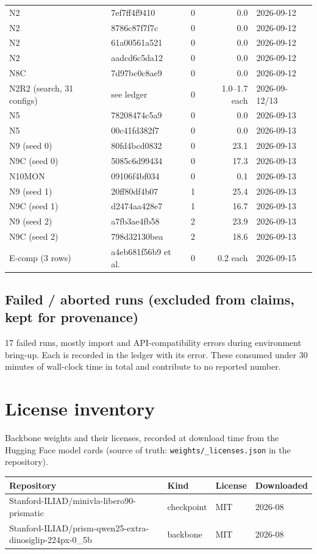 \documentclass[10pt]{article}
\begin{document}
\begin{longtable}{@{}llrrl@{}}
N2 & 7ef7ff4f9410 & 0 & 0.0 & 2026-09-12 \\
N2 & 8786c87f7f7c & 0 & 0.0 & 2026-09-12 \\
N2 & 61a00561a521 & 0 & 0.0 & 2026-09-12 \\
N2 & aadcd6c5da12 & 0 & 0.0 & 2026-09-12 \\
N8C & 7d97bc0c8ae9 & 0 & 0.0 & 2026-09-12 \\
N2R2 (search, 31 configs) & see ledger & 0 & 1.0--1.7 each & 2026-09-12/13 \\
N5 & 78208474c5a9 & 0 & 0.0 & 2026-09-13 \\
N5 & 00c41fd382f7 & 0 & 0.0 & 2026-09-13 \\
N9 (seed 0) & 80fd4bcd0832 & 0 & 23.1 & 2026-09-13 \\
N9C (seed 0) & 5085c6d99434 & 0 & 17.3 & 2026-09-13 \\
N10MON & 09106f4bf034 & 0 & 0.1 & 2026-09-13 \\
N9 (seed 1) & 20ff80df4b07 & 1 & 25.4 & 2026-09-13 \\
N9C (seed 1) & d2474aa428e7 & 1 & 16.7 & 2026-09-13 \\
N9 (seed 2) & a7fb3ae4fb58 & 2 & 23.9 & 2026-09-13 \\
N9C (seed 2) & 798d32130bea & 2 & 18.6 & 2026-09-13 \\
E-comp (3 rows) & a4eb681f56b9 et al. & 0 & 0.2 each & 2026-09-15 \\
\bottomrule
\end{longtable}

\subsection{Failed / aborted runs (excluded from claims, kept for provenance)}

17 failed runs, mostly import and API-compatibility errors during
environment bring-up. Each is recorded in the ledger with its error. These
consumed under 30 minutes of wall-clock time in total and contribute to no
reported number.

\section{License inventory}

Backbone weights and their licenses, recorded at download time from the
Hugging Face model cards (source of truth: \texttt{weights/\_licenses.json}
in the repository).

\begin{tabular}{@{}lp{3.2cm}p{4.2cm}l@{}}
\toprule
Repository & Kind & License & Downloaded \\
\midrule
Stanford-ILIAD/minivla-libero90-prismatic & checkpoint & MIT & 2026-08 \\
Stanford-ILIAD/prism-qwen25-extra-dinosiglip-224px-0\_5b & backbone & MIT & 2026-08 \\
\bottomrule
\end{tabular}
\end{document}
